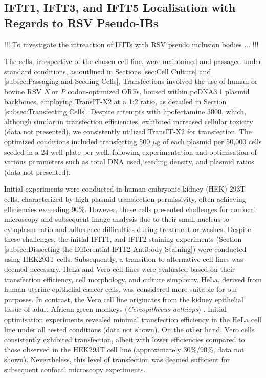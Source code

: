 \subsection{IFIT1, IFIT3, and IFIT5 Localisation with Regards to RSV Pseudo-IBs} \label{subsec:IFIT1, IFIT3, and IFIT5 Localisation with Regards to RSV Pseudo-IBs}


!!! To investigate the intreaction of IFITs with RSV pseudo inclusion bodies ... !!!

The cells, irrespective of the chosen cell line, were maintained and passaged under standard conditions, as outlined in Sections \ref{sec:Cell Culture} and \ref{subsec:Passaging and Seeding Cells}. Transfections involved the use of human or bovine RSV \textit{N} or \textit{P} codon-optimized ORFs, housed within pcDNA3.1 plasmid backbones, employing TransIT-X2 at a 1:2 ratio, as detailed in Section \ref{subsec:Transfecting Cells}. Despite attempts with lipofectamine 3000, which, although similar in transfection efficiencies, exhibited increased cellular toxicity (data not presented), we consistently utilized TransIT-X2 for transfection. The optimized conditions included transfecting 500 $\mu$g of each plasmid per 50,000 cells seeded in a 24-well plate per well, following experimentation and optimisation of various parameters such as total DNA used, seeding density, and plasmid ratios (data not presented).

Initial experiments were conducted in human embryonic kidney (HEK) 293T cells, characterized by high plasmid transfection permissivity, often achieving efficiencies exceeding 90\%. However, these cells presented challenges for confocal microscopy and subsequent image analysis due to their small nucleus-to-cytoplasm ratio and adherence difficulties during treatment or washes. Despite these challenges, the initial IFIT1, and IFIT2 staining experiments (Section \ref{subsec:Dissecting the Differential IFIT2 Antibody Staining}) were conducted using HEK293T cells. Subsequently, a transition to alternative cell lines was deemed necessary. HeLa and Vero cell lines were evaluated based on their transfection efficiency, cell morphology, and culture simplicity. HeLa, derived from human uterine epithelial cancer cells, was considered more suitable for our purposes. In contrast, the Vero cell line originates from the kidney epithelial tissue of adult African green monkeys (\textit{Cercopithecus aethiops}) \cite{Simizu1967CharacterizationVero}. Initial optimisation experiments revealed minimal transfection efficiency in the HeLa cell line under all tested conditions (data not shown). On the other hand, Vero cells consistently exhibited transfection, albeit with lower efficiencies compared to those observed in the HEK293T cell line (approximately 30\%/90\%, data not shown). Nevertheless, this level of transfection was deemed sufficient for subsequent confocal microscopy experiments.

